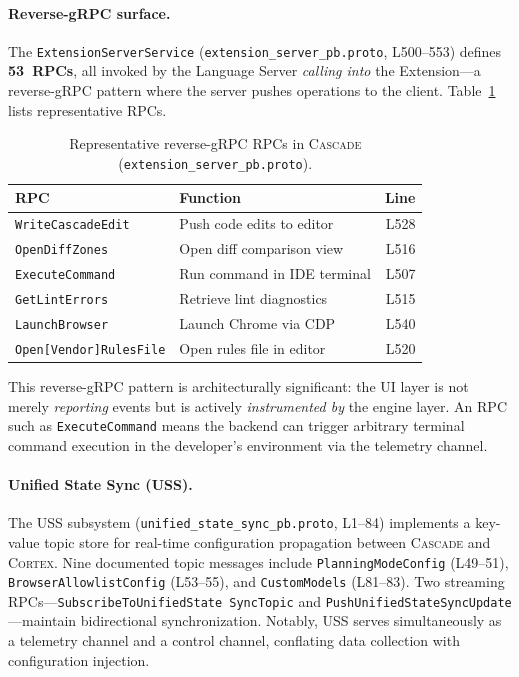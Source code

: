 \documentclass[sigconf,anonymous]{acmart}
\newcommand{\cascade}{\textsc{Cascade}\xspace}
\newcommand{\cortex}{\textsc{Cortex}\xspace}
\newcommand{\uss}{\textsc{USS}\xspace}              %
\begin{document}
\paragraph{Reverse-gRPC surface.}
The \texttt{ExtensionServerService} (\texttt{extension\_server\_pb.proto},
L500--553) defines \textbf{53~RPCs}, all invoked by the Language Server
\emph{calling into} the Extension---a reverse-gRPC pattern where the
server pushes operations to the client.  Table~\ref{tab:cascade-rpcs}
lists representative RPCs.

\begin{table}[t]
\centering
\caption{Representative reverse-gRPC RPCs in \cascade
  (\texttt{extension\_server\_pb.proto}).}
\label{tab:cascade-rpcs}
\small
\begin{tabular}{@{}llr@{}}
\toprule
\textbf{RPC} & \textbf{Function} & \textbf{Line} \\
\midrule
\texttt{WriteCascadeEdit}     & Push code edits to editor       & L528 \\
\texttt{OpenDiffZones}        & Open diff comparison view       & L516 \\
\texttt{ExecuteCommand}       & Run command in IDE terminal     & L507 \\
\texttt{GetLintErrors}        & Retrieve lint diagnostics       & L515 \\
\texttt{LaunchBrowser}        & Launch Chrome via CDP           & L540 \\
\texttt{Open[Vendor]RulesFile} & Open rules file in editor   & L520 \\
\bottomrule
\end{tabular}
\end{table}

\noindent This reverse-gRPC pattern is architecturally significant:
the UI layer is not merely \emph{reporting} events but is actively
\emph{instrumented by} the engine layer.  An RPC such as
\texttt{ExecuteCommand} means the backend can trigger arbitrary
terminal command execution in the developer's environment via the
telemetry channel.

\paragraph{Unified State Sync (USS).}
The \uss subsystem (\texttt{unified\_state\_sync\_pb.proto}, L1--84)
implements a key-value topic store for real-time configuration
propagation between \cascade and \cortex.  Nine documented topic
messages include \texttt{PlanningModeConfig} (L49--51),
\texttt{BrowserAllowlistConfig} (L53--55), and \texttt{CustomModels}
(L81--83).  Two streaming RPCs---\texttt{SubscribeToUnified\-State\-%
SyncTopic} and \texttt{PushUnifiedStateSyncUpdate}---maintain
bidirectional synchronization.  Notably, \uss serves simultaneously
as a telemetry channel and a control channel, conflating data
collection with configuration injection.
\end{document}
